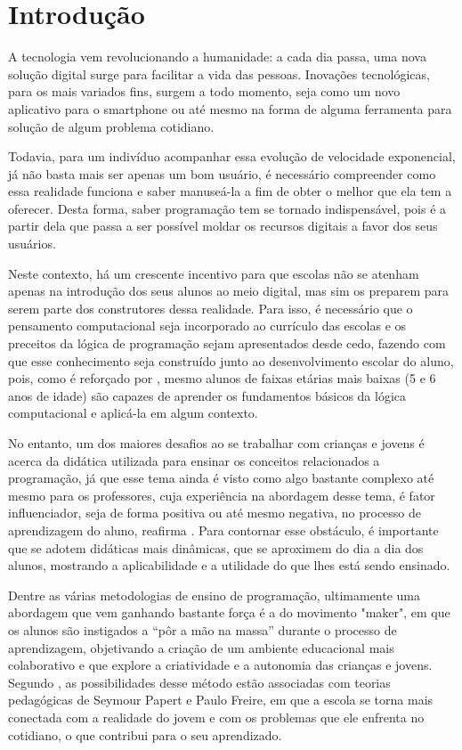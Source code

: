 \documentclass[12pt]{article}
\begin{document}
	\section{Introdução}
	A tecnologia vem revolucionando a humanidade: a cada dia passa, uma nova solução digital surge para facilitar a vida das pessoas. Inovações tecnológicas, para os mais variados fins, surgem a todo momento, seja como um novo aplicativo para o smartphone ou até mesmo na forma de alguma ferramenta para solução de algum problema cotidiano. 
    
    Todavia, para um indivíduo acompanhar essa evolução de velocidade exponencial, já não basta mais ser apenas um bom usuário, é necessário compreender como essa realidade funciona e saber manuseá-la a fim de obter o melhor que ela tem a oferecer. Desta forma, saber programação tem se tornado indispensável, pois é a partir dela que passa a ser possível moldar os recursos digitais a favor dos seus usuários.

Neste contexto, há um crescente incentivo para que escolas não se atenham apenas na introdução dos seus alunos ao meio digital, mas sim os preparem para serem parte dos construtores dessa realidade. Para isso, é necessário que o pensamento computacional seja incorporado ao currículo das escolas e os preceitos da lógica de programação sejam apresentados desde cedo, fazendo com que esse conhecimento seja construído junto ao desenvolvimento escolar do aluno, pois, como é reforçado por \cite{Martinez:2015:CPE:2729094.2742599}, mesmo alunos de faixas etárias mais baixas (5 e 6 anos de idade) são capazes de aprender os fundamentos básicos da lógica computacional e aplicá-la em algum contexto.

	No entanto, um dos maiores desafios ao se trabalhar com crianças e jovens é acerca da didática utilizada para ensinar os conceitos relacionados a programação, já que esse tema ainda é visto como algo bastante complexo até mesmo para os professores, cuja experiência na abordagem desse tema, é fator influenciador, seja de forma positiva ou até mesmo negativa, no processo de aprendizagem do aluno, reafirma \cite{Fagin:2003:MER:611892.611994}. Para contornar esse obstáculo, é importante que se adotem didáticas mais dinâmicas, que se aproximem do dia a dia dos alunos, mostrando a aplicabilidade e a utilidade do que lhes está sendo ensinado.
	
    Dentre as várias metodologias de ensino de programação, ultimamente uma abordagem que vem ganhando bastante força é a do movimento "maker", em que os alunos são instigados a “pôr a mão na massa” durante o processo de aprendizagem, objetivando a criação de um ambiente educacional mais colaborativo e que explore a criatividade e a autonomia das crianças e jovens. Segundo \cite{digitalFab}, as possibilidades desse método estão associadas com teorias pedagógicas de Seymour Papert e Paulo Freire, em que a escola se torna mais conectada com a realidade do jovem e com os problemas que ele enfrenta no cotidiano, o que contribui para o seu aprendizado.
    
\end{document}
